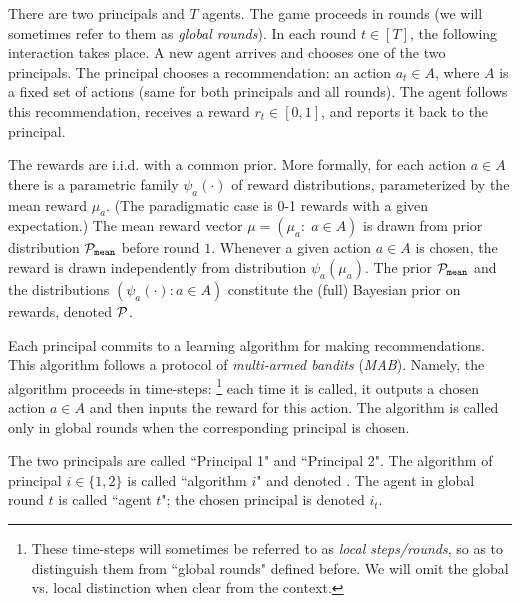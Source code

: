  There are two principals and $T$ agents. The game proceeds in rounds (we will sometimes refer to them as \emph{global rounds}). In each round $t\in [T]$, the following  interaction takes place. A new agent arrives and chooses one of the two principals. The principal chooses a recommendation: an action $a_t\in A$, where $A$ is a fixed set of actions (same for both principals and all rounds). The agent follows this recommendation, receives a reward $r_t\in [0,1]$, and reports it back to the principal.

The rewards are i.i.d. with a common prior. More formally, for each action $a\in A$ there is a parametric family $\psi_a(\cdot)$ of
reward distributions, parameterized by the mean reward $\mu_a$. (The paradigmatic case is 0-1 rewards with a given expectation.) The
mean reward vector $\mu = (\mu_a:\; a\in A)$ is drawn from prior distribution $\mathcal{P}_\mathtt{mean}$ before round $1$. Whenever a given action $a\in A$ is chosen, the reward is drawn independently from distribution $\psi_a(\mu_a)$. The prior $\mathcal{P}_\mathtt{mean}$ and the distributions $(\psi_a(\cdot)\colon a\in A)$ constitute the (full) Bayesian prior on rewards, denoted $\mathcal{P}$.

Each principal commits to a learning algorithm for making recommendations. This algorithm follows a protocol of \emph{multi-armed bandits} (\emph{MAB}). Namely, the algorithm proceeds in time-steps:%
\footnote{These time-steps will sometimes be referred to as \emph{local steps/rounds}, so as to distinguish them from ``global rounds" defined before. We will omit the global vs. local distinction when clear from the context.} each time it is called, it outputs a chosen action $a\in A$ and then inputs the reward for this action. The algorithm is called only in global rounds when the corresponding principal is chosen.

 The two principals are called ``Principal
1" and ``Principal 2".
The algorithm of principal $i\in \{1,2\}$ is called ``algorithm $i$" and denoted
\alg[i]. The agent in global round $t$ is called ``agent $t$"; the
chosen principal is denoted $i_t$.

